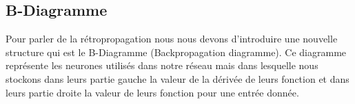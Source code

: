 \documentclass{article}
\begin{document}
\subsection {B-Diagramme}
Pour parler de la rétropropagation  nous nous devons d'introduire une nouvelle structure qui est le B-Diagramme (Backpropagation diagramme).
Ce diagramme représente les neurones utilisés dans notre réseau mais dans lesquelle nous stockons dans leurs partie gauche la valeur de la dérivée de leurs fonction et dans leurs partie droite la valeur de leurs fonction pour une entrée donnée.\\
\newline
\vfill
\begin{center}
\end{center}
\vfill
 
\end{document}
